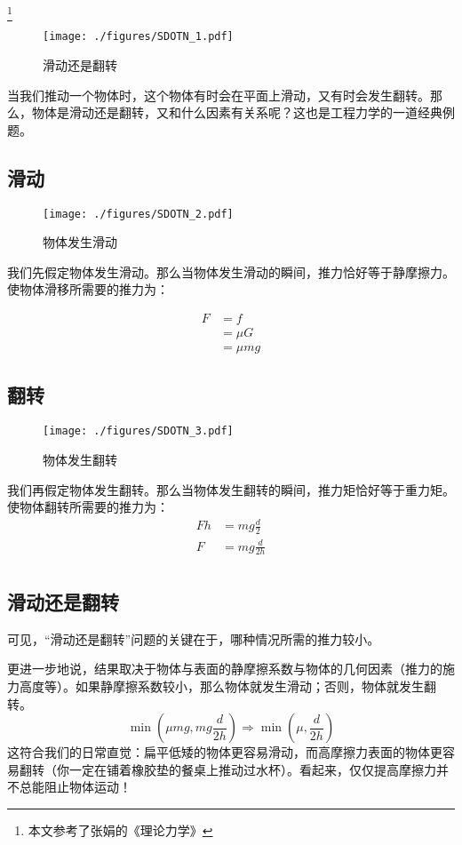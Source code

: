 
\begin{issues}
\issueMissDepend
\end{issues}

\footnote{本文参考了张娟的《理论力学》}

\begin{figure}[ht]
\centering
\texttt{[image: ./figures/SDOTN\_1.pdf]}
\caption{滑动还是翻转} \label{SDOTN_fig1}
\end{figure}

当我们推动一个物体时，这个物体有时会在平面上滑动，又有时会发生翻转。那么，物体是滑动还是翻转，又和什么因素有关系呢？这也是工程力学的一道经典例题。

\subsection{滑动}
\begin{figure}[ht]
\centering
\texttt{[image: ./figures/SDOTN\_2.pdf]}
\caption{物体发生滑动} \label{SDOTN_fig2}
\end{figure}
我们先假定物体发生滑动。那么当物体发生滑动的瞬间，推力恰好等于静摩擦力。使物体滑移所需要的推力为：

\begin{equation}
\begin{aligned}
F&=f\\
&=\mu G\\
&=\mu mg
\end{aligned}
\end{equation}

\subsection{翻转}
\begin{figure}[ht]
\centering
\texttt{[image: ./figures/SDOTN\_3.pdf]}
\caption{物体发生翻转} \label{SDOTN_fig3}
\end{figure}
我们再假定物体发生翻转。那么当物体发生翻转的瞬间，推力矩恰好等于重力矩。使物体翻转所需要的推力为：
\begin{equation}
\begin{aligned}
Fh&=mg \frac{d}{2}\\
F&=mg \frac{d}{2h}\\
\end{aligned}
\end{equation}

\subsection{滑动还是翻转}
可见，“滑动还是翻转”问题的关键在于，哪种情况所需的推力较小。

更进一步地说，结果取决于物体与表面的静摩擦系数与物体的几何因素（推力的施力高度等）。如果静摩擦系数较小，那么物体就发生滑动；否则，物体就发生翻转。
\begin{equation}
\min(\mu mg, mg \frac{d}{2h})\Rightarrow
\min(\mu, \frac{d}{2h})
\end{equation}
这符合我们的日常直觉：扁平低矮的物体更容易滑动，而高摩擦力表面的物体更容易翻转（你一定在铺着橡胶垫的餐桌上推动过水杯）。看起来，仅仅提高摩擦力并不总能阻止物体运动！
